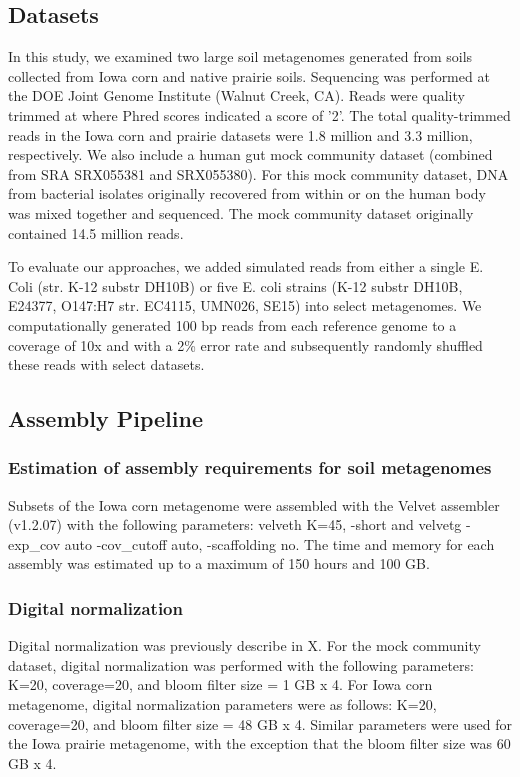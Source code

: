 \documentclass[11pt]{article} %
\begin{document}
\subsection{Datasets}
In this study, we examined two large soil metagenomes generated from soils collected from Iowa corn and native prairie soils.  Sequencing was performed at the DOE Joint Genome Institute (Walnut Creek, CA).   Reads were quality trimmed at where Phred scores indicated a score of '2'.  The total quality-trimmed reads in the Iowa corn and prairie datasets were 1.8 million and 3.3 million, respectively.  We also include a human gut mock community dataset (combined from SRA SRX055381 and SRX055380).  For this mock community dataset, DNA from bacterial isolates originally recovered from within or on the human body was mixed together and sequenced.  The mock community dataset originally contained 14.5 million reads.  

To evaluate our approaches, we added simulated reads from either a single E. Coli (str. K-12 substr DH10B) or five E. coli strains (K-12 substr DH10B, E24377, O147:H7 str. EC4115, UMN026, SE15) into select metagenomes.  We computationally generated 100 bp reads from each reference genome to a coverage of 10x and with a 2\% error rate and subsequently randomly shuffled these reads with select datasets.

\subsection{Assembly Pipeline}
\subsubsection{Estimation of assembly requirements for soil metagenomes}
Subsets of the Iowa corn metagenome were assembled with the Velvet assembler (v1.2.07) with the following parameters:  velveth K=45, -short and velvetg -exp\_cov auto -cov\_cutoff auto, -scaffolding no.  The time and memory for each assembly was estimated up to a maximum of 150 hours and 100 GB.

\subsubsection{Digital normalization}
Digital normalization was previously describe in X.  For the mock community dataset, digital normalization was performed with the following parameters:  K=20, coverage=20, and bloom filter size = 1 GB x 4.  For Iowa corn metagenome, digital normalization parameters were as follows:  K=20, coverage=20, and bloom filter size = 48 GB x 4.  Similar parameters were used for the Iowa prairie metagenome, with the exception that the bloom filter size was 60 GB x 4.
\end{document}
